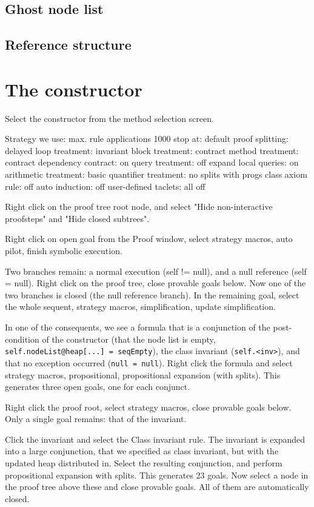\documentclass[runningheads]{llncs}
\begin{document}
\subsection{Ghost node list}
\subsection{Reference structure}

\section{The constructor}\label{sec:constructor}

Select the constructor from the method selection screen.

Strategy we use:
max. rule applications 1000
stop at: default
proof splitting: delayed
loop treatment: invariant
block treatment: contract
method treatment: contract
dependency contract: on
query treatment: off
expand local queries: on
arithmetic treatment: basic
quantifier treatment: no splits with progs
class axiom rule: off
auto induction: off
user-defined taclets: all off

Right click on the proof tree root node, and select "Hide non-interactive proofsteps" and "Hide closed subtrees".

Right click on open goal from the Proof window, select strategy macros, auto pilot, finish symbolic execution.

Two branches remain: a normal execution (self != null), and a null reference (self = null). Right click on the proof tree, close provable goals below. Now one of the two branches is closed (the null reference branch). In the remaining goal, select the whole sequent, strategy macros, simplification, update simplification.

In one of the consequents, we see a formula that is a conjunction of the post-condition of the constructor (that the node list is empty, \texttt{self.nodeList@heap[...] = seqEmpty}), the class invariant (\texttt{self.<inv>}), and that no exception occurred (\texttt{null = null}). Right click the formula and select strategy macros, propositional, propositional expansion (with splits). This generates three open goals, one for each conjunct.

Right click the proof root, select strategy macros, close provable goals below. Only a single goal remains: that of the invariant.

Click the invariant and select the Class invariant rule. The invariant is expanded into a large conjunction, that we specified as class invariant, but with the updated heap distributed in. Select the resulting conjunction, and perform propositional expansion with splits. This generates 23 goals. Now select a node in the proof tree above these and close provable goals. All of them are automatically closed.
\end{document}
